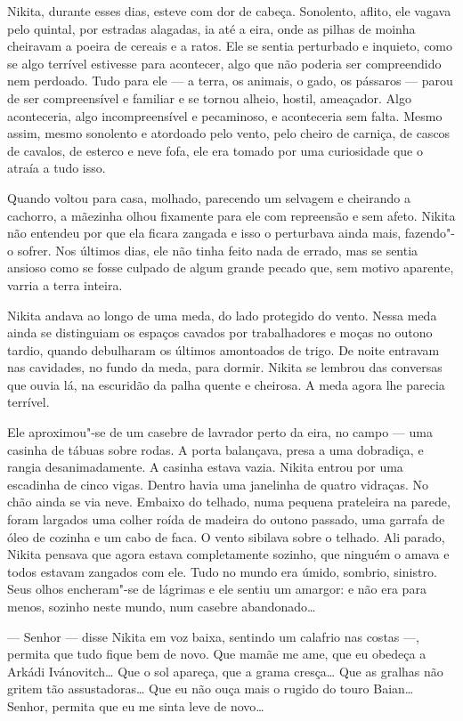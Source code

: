 Nikita, durante esses dias, esteve com dor de cabeça. Sonolento, aflito,
ele vagava pelo quintal, por estradas alagadas, ia até a eira, onde as
pilhas de moinha cheiravam a poeira de cereais e a ratos. Ele se sentia
perturbado e inquieto, como se algo terrível estivesse para acontecer,
algo que não poderia ser compreendido nem perdoado. Tudo para ele --- a terra, os
animais, o gado, os pássaros --- parou de ser compreensível e familiar
e se tornou alheio, hostil, ameaçador. Algo aconteceria,
algo incompreensível e pecaminoso, e aconteceria sem falta. Mesmo assim,
mesmo sonolento e atordoado pelo vento, pelo cheiro de carniça, de
cascos de cavalos, de esterco e neve fofa, ele era tomado por uma
curiosidade que o atraía a tudo isso.

Quando voltou para casa, molhado, parecendo um selvagem e cheirando a
cachorro, a mãezinha olhou fixamente para ele com repreensão e sem
afeto. Nikita não entendeu por que ela ficara zangada e isso o
perturbava ainda mais, fazendo"-o sofrer. Nos últimos dias, ele não tinha
feito nada de errado, mas se sentia ansioso como se fosse culpado de
algum grande pecado que, sem motivo aparente, varria a terra inteira.

Nikita andava ao longo de uma meda, do lado protegido do vento. Nessa
meda ainda se distinguiam os espaços cavados por trabalhadores e moças
no outono tardio, quando debulharam os últimos amontoados de trigo. De
noite entravam nas cavidades, no fundo da meda, para dormir. Nikita se
lembrou das conversas que ouvia lá, na escuridão da palha quente e
cheirosa. A meda agora lhe parecia terrível.

Ele aproximou"-se de um casebre de lavrador perto da eira, no
campo --- uma casinha de tábuas sobre rodas. A porta balançava, presa a
uma dobradiça, e rangia desanimadamente. A casinha estava vazia. Nikita
entrou por uma escadinha de cinco vigas. Dentro havia uma janelinha de
quatro vidraças. No chão ainda se via neve. Embaixo do telhado, numa
pequena prateleira na parede, foram largados uma colher roída de madeira
do outono passado, uma garrafa de óleo de cozinha e um cabo de faca. O
vento sibilava sobre o telhado. Ali parado, Nikita pensava que agora
estava completamente sozinho, que ninguém o amava e todos estavam
zangados com ele. Tudo no mundo era úmido, sombrio, sinistro. Seus olhos
encheram"-se de lágrimas e ele sentiu um amargor: e não era para menos,
sozinho neste mundo, num casebre abandonado\ldots{}

--- Senhor --- disse Nikita em voz baixa, sentindo um calafrio nas
costas ---, permita que tudo fique bem de novo. Que mamãe me ame, que eu
obedeça a Arkádi Ivánovitch\ldots{} Que o sol apareça, que a grama cresça\ldots{}
Que as gralhas não gritem tão assustadoras\ldots{} Que eu não ouça mais o
rugido do touro Baian\ldots{} Senhor, permita que eu me sinta leve de novo\ldots{}

